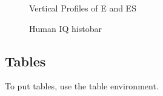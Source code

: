 \documentclass[10pt,a4paper]{article}
\begin{document}
\begin{figure}
\centering
{}
\caption{Vertical Profiles of E and ES}
\label{eVSz}
\end{figure}

\begin{figure}
\centering
{}
\caption{Human IQ histobar}
\label{IQ}
\end{figure}

\subsection{Tables}

To put tables, use the table environment.
\end{document}
